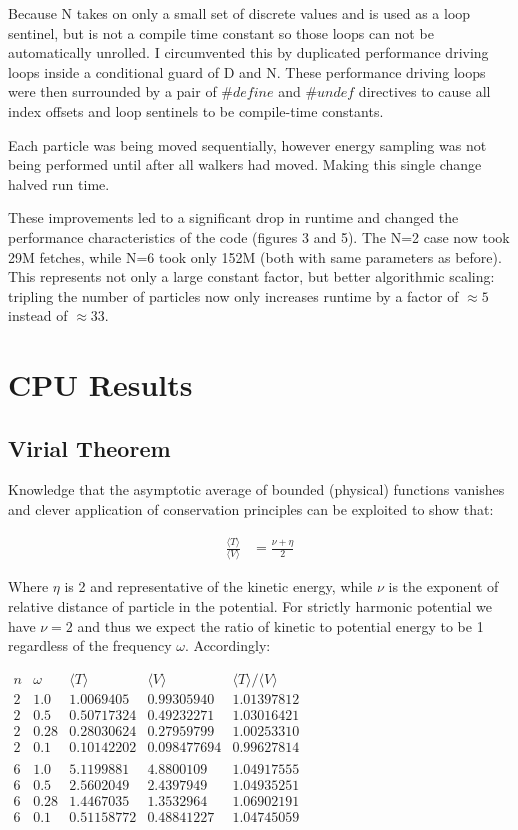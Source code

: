\documentclass[11pt, conference, compsocconf]{IEEEtran}
\begin{document}
Because N takes on only a small set of discrete values and is used as a loop sentinel, but is not a compile time constant so those loops can not be automatically unrolled. I circumvented this by duplicated performance driving loops inside a conditional guard of D and N. These performance driving loops were then surrounded by a pair of $\#define$ and $\#undef$ directives to cause all index offsets and loop sentinels to be compile-time constants. 

Each particle was being moved sequentially, however energy sampling was not being performed until after all walkers had moved. Making this single change halved run time.

These improvements led to a significant drop in runtime and changed the performance characteristics of the code (figures 3 and 5). The N=2 case now took 29M fetches, while N=6 took only 152M (both with same parameters as before). This represents not only a large constant factor, but better algorithmic scaling: tripling the number of particles now only increases runtime by a factor of $\approx5$ instead of $\approx33$.

\section{CPU Results}
\subsection{Virial Theorem}
Knowledge that the asymptotic average of bounded (physical) functions vanishes and clever application of conservation principles can be exploited to show that:

\begin{align}\frac{\langle T\rangle}{\langle V\rangle} &= \frac{\nu + \eta}{2}\end{align}

Where $\eta$ is 2 and representative of the kinetic energy, while $\nu$ is the exponent of relative distance of particle in the potential. For strictly harmonic potential we have $\nu=2$ and thus we expect the ratio of kinetic to potential energy to be 1 regardless of the frequency $\omega$. Accordingly:

$\begin{array}{ccccc}
n & \omega & \langle T\rangle & \langle V\rangle & \langle T\rangle / \langle V\rangle \\
2 & 1.0 & 1.0069405  &   0.99305940 	& 1.01397812 \\
2 & 0.5 & 0.50717324 &   0.49232271		& 1.03016421 \\
2 & 0.28 & 0.28030624 &  0.27959799 	& 1.00253310 \\
2 & 0.1 & 0.10142202 & 0.098477694 		& 0.99627814 \\
 & & & & \\
6 & 1.0 	& 5.1199881 	& 4.8800109 	& 1.04917555\\
6 & 0.5 	&  2.5602049	& 2.4397949		& 1.04935251 \\
6 & 0.28	&	1.4467035	& 1.3532964 	& 1.06902191 \\
6 & 0.1 	& 0.51158772 	& 0.48841227 	& 1.04745059 \\
\end{array}$
\end{document}
